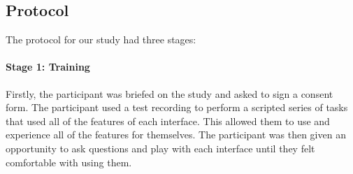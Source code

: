 





\subsection{Protocol}

The protocol for our study had three stages:

\paragraph{Stage 1: Training}

Firstly, the participant was briefed on the study and asked to sign a consent form.  The participant used a test
recording to perform a scripted series of tasks that used all of the features of each interface.  This allowed them to
use and experience all of the features for themselves. The participant was then given an opportunity to ask questions
and play with each interface until they felt comfortable with using them.

